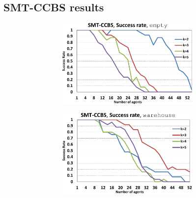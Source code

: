 \documentclass[review]{elsarticle}
\newcommand{\smtccbs}{SMT-CCBS\xspace}
\begin{document}
\subsection{\smtccbs results}

\begin{figure}[h]
\centering
\begin{subfigure}
    \centering
    \begin{subfigure}
        \centering
        \includegraphics[width=0.45\linewidth]{mapfr-sr-plot-smtcbs-empty.pdf}
    \end{subfigure}\hspace{0.025\linewidth}
    \begin{subfigure}
        \centering
        \includegraphics[width=0.45\linewidth]{mapfr-sr-plot-smtcbs-warehouse.pdf}
    \end{subfigure}%
\end{subfigure}

\begin{subfigure}
    \centering


\end{subfigure}
\end{figure}
\end{document}
